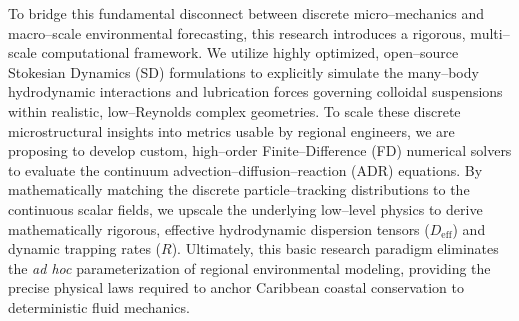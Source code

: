 To bridge this fundamental disconnect between discrete micro--mechanics and macro--scale environmental forecasting, this research introduces a rigorous, multi--scale computational framework. We utilize highly optimized, open--source Stokesian Dynamics (SD) formulations \cite{brady1988stokesian, durlofsky1987dynamic, sierou2001accelerated, banchio2003accelerated} to explicitly simulate the many--body hydrodynamic interactions and lubrication forces governing colloidal suspensions within realistic, low--Reynolds complex geometries. To scale these discrete microstructural insights into metrics usable by regional engineers, we are proposing to develop custom, high--order Finite--Difference (FD) numerical solvers to evaluate the continuum advection--diffusion--reaction (ADR) equations. By mathematically matching the discrete particle--tracking distributions to the continuous scalar fields, we upscale the underlying low--level physics to derive mathematically rigorous, effective hydrodynamic dispersion tensors ($D_{\text{eff}}$) and dynamic trapping rates ($R$). Ultimately, this basic research paradigm eliminates the \emph{ad hoc} parameterization  of regional environmental modeling, providing the precise physical laws required to anchor Caribbean coastal conservation to deterministic fluid mechanics.
